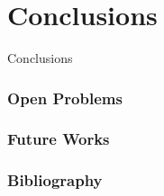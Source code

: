 \documentclass[dvipsnames, 10pt]{beamer}
\begin{document}
\section{Conclusions}
\begin{frame}
  \centering
  \Huge
  Conclusions
\end{frame}

\begin{frame}
  \frametitle{Open Problems}
\end{frame}

\begin{frame}
  \frametitle{Future Works}
\end{frame}

\begin{frame}
\frametitle{Bibliography}
\printbibliography
\nocite{*}
\end{frame}
\end{document}
